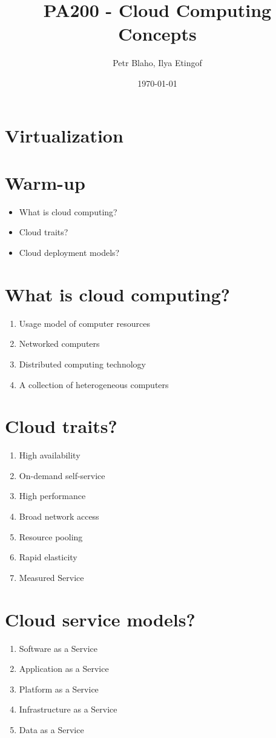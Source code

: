 \documentclass[11pt]{article}
\author{Petr Blaho, Ilya Etingof}
\date{\today}
\title{PA200 - Cloud Computing Concepts}
\begin{document}
\maketitle


\section*{Virtualization}
\label{sec:orgef62a99}

\section*{Warm-up}
\label{sec:orgfa15cdd}
\begin{itemize}
\item What is cloud computing?
\item Cloud traits?
\item Cloud deployment models?
\end{itemize}

\section*{What is cloud computing?}
\label{sec:org47dc5e8}
\begin{enumerate}
\item Usage model of computer resources
\item Networked computers
\item Distributed computing technology
\item A collection of heterogeneous computers
\end{enumerate}

\section*{Cloud traits?}
\label{sec:orgf228b2b}
\begin{enumerate}
\item High availability
\item On-demand self-service
\item High performance
\item Broad network access
\item Resource pooling
\item Rapid elasticity
\item Measured Service
\end{enumerate}

\section*{Cloud service models?}
\label{sec:orgf23ebd5}
\begin{enumerate}
\item Software as a Service
\item Application as a Service
\item Platform as a Service
\item Infrastructure as a Service
\item Data as a Service
\end{enumerate}
\end{document}
